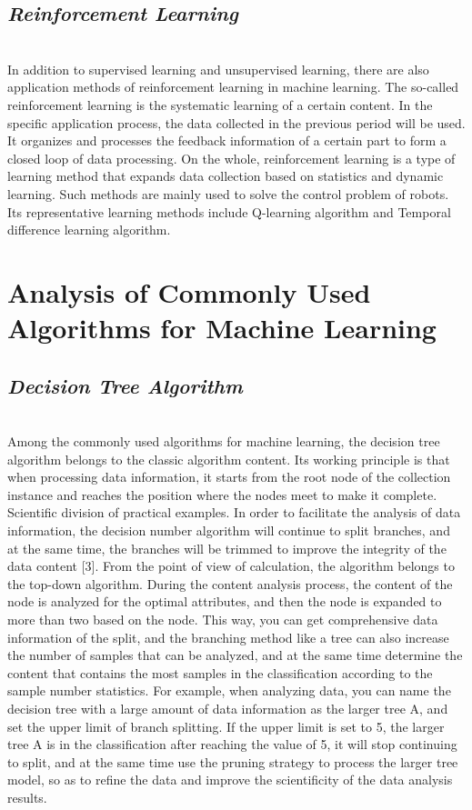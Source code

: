 \documentclass{article}
\begin{document}
\subsection{\emph{Reinforcement Learning}}\\
In addition to supervised learning and unsupervised learning, there are also application methods of 
reinforcement learning in machine learning. The so-called reinforcement learning is the systematic 
learning of a certain content. In the specific application process, the data collected in the previous 
period will be used. It organizes and processes the feedback information of a certain part to form a 
closed loop of data processing. On the whole, reinforcement learning is a type of learning method that 
expands data collection based on statistics and dynamic learning. Such methods are mainly used to 
solve the control problem of robots. Its representative learning methods include Q-learning algorithm 
and Temporal difference learning algorithm.

\section{Analysis of Commonly Used Algorithms for Machine Learning
}
\subsection{\emph{Decision Tree Algorithm}}\\
Among the commonly used algorithms for machine learning, the decision tree algorithm belongs to 
the classic algorithm content. Its working principle is that when processing data information, it starts 
from the root node of the collection instance and reaches the position where the nodes meet to make it 
complete. Scientific division of practical examples. In order to facilitate the analysis of data 
information, the decision number algorithm will continue to split branches, and at the same time, the 
branches will be trimmed to improve the integrity of the data content [3]. From the point of view of 
calculation, the algorithm belongs to the top-down algorithm. During the content analysis process, the 
content of the node is analyzed for the optimal attributes, and then the node is expanded to more than 
two based on the node. This way, you can get comprehensive data information of the split, and the 
branching method like a tree can also increase the number of samples that can be analyzed, and at the 
same time determine the content that contains the most samples in the classification according to the 
sample number statistics. For example, when analyzing data, you can name the decision tree with a 
large amount of data information as the larger tree A, and set the upper limit of branch splitting. If the 
upper limit is set to 5, the larger tree A is in the classification after reaching the value of 5, it will 
stop continuing to split, and at the same time use the pruning strategy to process the larger tree model, 
so as to refine the data and improve the scientificity of the data analysis results.
\\\\
\end{document}
